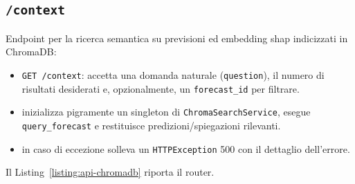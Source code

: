 \subsection{\texttt{/context}}
\label{sec:code-api-chromadb}
Endpoint per la ricerca semantica su previsioni ed \gls{embedding} \acrshort{shap} indicizzati in ChromaDB:
\begin{itemize}
    \item \texttt{GET /context}: accetta una domanda naturale (\texttt{question}), il numero di risultati desiderati e, opzionalmente, un \texttt{forecast\_id} per filtrare.
    \item inizializza pigramente un singleton di \texttt{ChromaSearchService}, esegue \texttt{query\_forecast} e restituisce predizioni/spiegazioni rilevanti.
    \item in caso di eccezione solleva un \texttt{HTTPException} 500 con il dettaglio dell’errore.
\end{itemize}
Il Listing~\ref{listing:api-chromadb} riporta il router.
\captionsetup{type=listing, belowskip=0pt}
\inputminted[fontsize=\small, breaklines, breakanywhere=true, linenos=true, bgcolor=gray!10]{python}{code/api/chromadb.py}
\label{listing:api-chromadb}

\newpage
